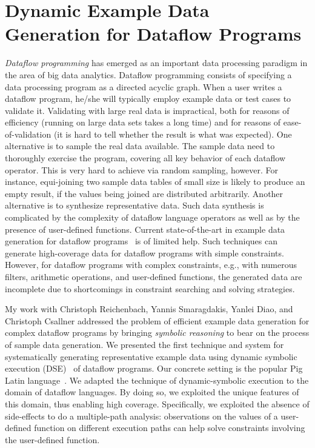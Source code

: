 \documentclass[proposal]{umthesis} %
\begin{document}
\section{Dynamic Example Data Generation for Dataflow Programs}

\emph{Dataflow programming} has emerged as an important data
processing paradigm in the area of big data analytics. Dataflow
programming consists of specifying a data processing program as a
directed acyclic graph. 
When a user writes a dataflow program, he/she will typically employ
example data or test cases to validate it. Validating with large real
data is impractical, both for reasons of efficiency (running on large
data sets takes a long time) and for reasons of ease-of-validation (it
is hard to tell whether the result is what was expected). One
alternative is to sample the real data available. The sample data need
to thoroughly exercise the program, covering all key behavior of each
dataflow operator. This is very hard to achieve via random sampling,
however. For instance, equi-joining two sample data tables of small
size is likely to produce an empty result, if the values being joined
are distributed arbitrarily.
Another alternative is to synthesize representative data.  Such data
synthesis is complicated by the complexity of dataflow language
operators as well as by the presence of user-defined functions.
Current state-of-the-art in example data generation for dataflow
programs~\cite{Olston:2009:GED:1559845.1559873} is of limited
help. Such techniques can generate high-coverage data for dataflow
programs with simple constraints. However, for dataflow programs with
complex constraints, e.g., with numerous filters, arithmetic
operations, and user-defined functions, the generated data are
incomplete due to shortcomings in constraint searching and solving
strategies.

My work \cite{6693083} with Christoph Reichenbach, Yannis Smaragdakis, Yanlei Diao, and Christoph Csallner addressed the problem of efficient example data
generation for complex dataflow programs by bringing {\em
  symbolic reasoning} to bear on the process of sample data
generation.  We presented the first technique and system for
systematically generating representative example data using dynamic
symbolic execution (DSE)~\cite{godefroid05dart,cadar05execution,tillmann:08} of dataflow programs.  Our
concrete setting is the popular Pig Latin
language~\cite{Olston:2008:PLN:1376616.1376726}.  We adapted the technique of dynamic-symbolic execution to the domain of dataflow languages. By doing so, we exploited the unique features of this domain, thus enabling high coverage. Specifically,
  we exploited the absence of side-effects to do a
  multiple-path analysis: observations on the values of a user-defined
  function on different execution paths can help solve constraints
  involving the user-defined function.
\end{document}
